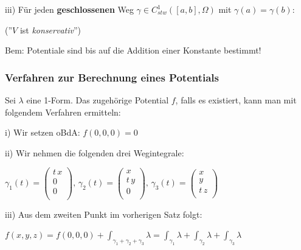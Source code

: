 \documentclass[a4paper, fontsize = 8pt, landscape]{scrartcl}
\newcommand{\eqbox}[1]{\fcolorbox{black}{white}{\hspace{0.5em}#1\hspace{0.5em}}}
\begin{document}
\begin{multicols*}{3}
    iii) Für jeden \textbf{geschlossenen} Weg $\gamma \in C^1_{stw}([a,b], \Omega)$ mit $\gamma(a) = \gamma(b)$:

    \begin{center}
        \eqbox{$\displaystyle \int\limits_{\gamma} \lambda = 0$} \quad (''$V$ ist \emph{konservativ}'')
    \end{center}

    Bem: Potentiale sind bis auf die Addition einer Konstante bestimmt!


    \subsubsection{Verfahren zur Berechnung eines Potentials}

    Sei $\lambda$ eine 1-Form. Das zugehörige Potential $f$, falls es existiert, kann man mit folgendem Verfahren ermitteln: \medskip

    i) Wir setzen oBdA:  $f(0,0,0) = 0$ \medskip

    ii) Wir nehmen die folgenden drei Wegintegrale:

    \begin{center}
        $\gamma_1(t) = \begin{pmatrix}
                t \, x \\ 0 \\ 0 \\
            \end{pmatrix}, \, \gamma_2(t) = \begin{pmatrix}
                x \\ t \, y \\ 0 \\
            \end{pmatrix}, \, \gamma_3(t) = \begin{pmatrix}
                x \\ y \\ t \, z \\
            \end{pmatrix}$
    \end{center}

    iii) Aus dem zweiten Punkt im vorherigen Satz folgt:

    \begin{center}
        $\displaystyle f(x,y,z) = f(0,0,0) + \int_{\gamma_1 + \gamma_2 + \gamma_3} \lambda = \int_{\gamma_1} \lambda + \int_{\gamma_2} \lambda + \int_{\gamma_3} \lambda$
    \end{center}


\end{multicols*}
\end{document}
